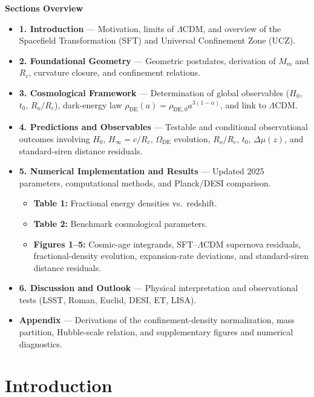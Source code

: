 \documentclass[12pt]{article}
\begin{document}
\tableofcontents
\bigskip

\noindent
\textbf{Sections Overview}
\begin{itemize}
    \item \textbf{1. Introduction} — Motivation, limits of $\Lambda$CDM, and overview of the Spacefield Transformation (SFT) and Universal Confinement Zone (UCZ).
    \item \textbf{2. Foundational Geometry} — Geometric postulates, derivation of $M_m$ and $R_c$, curvature closure, and confinement relations.
    \item \textbf{3. Cosmological Framework} — Determination of global observables ($H_0$, $t_0$, $R_o/R_c$), dark-energy law $\rho_{\mathrm{DE}}(a)=\rho_{\mathrm{DE},0}a^{3(1-\alpha)}$, and link to $\Lambda$CDM.
   \item \textbf{4. Predictions and Observables} — Testable and conditional observational outcomes involving $H_0$, $H_\infty=c/R_c$, $\Omega_{\mathrm{DE}}$ evolution, $R_o/R_c$, $t_0$, $\Delta\mu(z)$, and standard-siren distance residuals.
\item \textbf{5. Numerical Implementation and Results} — Updated 2025 parameters, computational methods, and Planck/DESI comparison.
    \begin{itemize}
        \item \textbf{Table 1:} Fractional energy densities vs.\ redshift.
        \item \textbf{Table 2:} Benchmark cosmological parameters.
        \item \textbf{Figures 1--5:} Cosmic-age integrands, SFT--$\Lambda$CDM
        supernova residuals, fractional-density evolution,
        expansion-rate deviations, and standard-siren distance residuals.
    \end{itemize}
    \item \textbf{6. Discussion and Outlook} — Physical interpretation and observational tests (LSST, Roman, Euclid, DESI, ET, LISA).
    \item \textbf{Appendix} — Derivations of the confinement-density normalization,
mass partition, Hubble-scale relation, and supplementary figures and
numerical diagnostics.
\end{itemize}




\section{Introduction}
\end{document}
